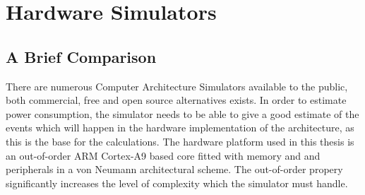 \section{Hardware Simulators}

\subsection{A Brief Comparison}
\label{subsec:simulators}
There are numerous Computer Architecture Simulators available to the public,
both commercial, free and open source alternatives exists. In order to estimate
power consumption, the simulator needs to be able to give a good estimate of the
events which will happen in the hardware implementation of the architecture, as
this is the base for the calculations. The hardware platform used in this thesis
is an out-of-order ARM Cortex-A9 based core fitted with memory and and
peripherals in a von Neumann architectural scheme. The out-of-order propery
significantly increases the level of complexity which the simulator must handle.

